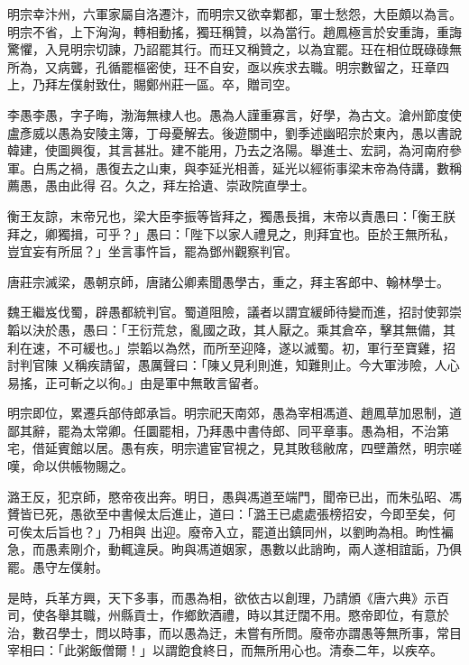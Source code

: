 \begin{pinyinscope}
 明宗幸汴州，六軍家屬自洛遷汴，而明宗又欲幸鄴都，軍士愁怨，大臣頗以為言。明宗不省，上下洶洶，轉相動搖，獨玨稱贊，以為當行。趙鳳極言於安重誨，重誨
 驚懼，入見明宗切諫，乃詔罷其行。而玨又稱贊之，以為宜罷。玨在相位既碌碌無所為，又病聾，孔循罷樞密使，玨不自安，亟以疾求去職。明宗數留之，玨章四上，乃拜左僕射致仕，賜鄭州莊一區。卒，贈司空。



 李愚李愚，字子晦，渤海無棣人也。愚為人謹重寡言，好學，為古文。滄州節度使盧彥威以愚為安陵主簿，丁母憂解去。後遊關中，劉季述幽昭宗於東內，愚以書說韓建，使圖興復，其言甚壯。建不能用，乃去之洛陽。舉進士、宏詞，為河南府參軍。白馬之禍，愚復去之山東，與李延光相善，延光以經術事梁末帝為侍講，數稱薦愚，愚由此得
 召。久之，拜左拾遺、崇政院直學士。



 衡王友諒，末帝兄也，梁大臣李振等皆拜之，獨愚長揖，末帝以責愚曰：「衡王朕拜之，卿獨揖，可乎？」愚曰：「陛下以家人禮見之，則拜宜也。臣於王無所私，豈宜妄有所屈？」坐言事忤旨，罷為鄧州觀察判官。



 唐莊宗滅梁，愚朝京師，唐諸公卿素聞愚學古，重之，拜主客郎中、翰林學士。



 魏王繼岌伐蜀，辟愚都統判官。蜀道阻險，議者以謂宜緩師待變而進，招討使郭崇韜以決於愚，愚曰：「王衍荒怠，亂國之政，其人厭之。乘其倉卒，擊其無備，其利在速，不可緩也。」崇韜以為然，而所至迎降，遂以滅蜀。初，軍行至寶雞，招討判官陳
 乂稱疾請留，愚厲聲曰：「陳乂見利則進，知難則止。今大軍涉險，人心易搖，正可斬之以徇。」由是軍中無敢言留者。



 明宗即位，累遷兵部侍郎承旨。明宗祀天南郊，愚為宰相馮道、趙鳳草加恩制，道鄙其辭，罷為太常卿。任圜罷相，乃拜愚中書侍郎、同平章事。愚為相，不治第宅，借延賓館以居。愚有疾，明宗遣宦官視之，見其敗毯敝席，四壁蕭然，明宗嗟嘆，命以供帳物賜之。



 潞王反，犯京師，愍帝夜出奔。明日，愚與馮道至端門，聞帝已出，而朱弘昭、馮贇皆已死，愚欲至中書候太后進止，道曰：「潞王已處處張榜招安，今即至矣，何可俟太后旨也？」乃相與
 出迎。廢帝入立，罷道出鎮同州，以劉昫為相。昫性褊急，而愚素剛介，動輒違戾。昫與馮道姻家，愚數以此誚昫，兩人遂相誼詬，乃俱罷。愚守左僕射。



 是時，兵革方興，天下多事，而愚為相，欲依古以創理，乃請頒《唐六典》示百司，使各舉其職，州縣貢士，作鄉飲酒禮，時以其迂闊不用。愍帝即位，有意於治，數召學士，問以時事，而以愚為迂，未嘗有所問。廢帝亦謂愚等無所事，常目宰相曰：「此粥飯僧爾！」以謂飽食終日，而無所用心也。清泰二年，以疾卒。




\end{pinyinscope}
